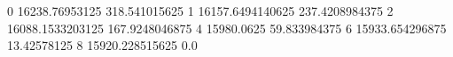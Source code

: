0 16238.76953125 318.541015625
1 16157.6494140625 237.4208984375
2 16088.1533203125 167.9248046875
4 15980.0625 59.833984375
6 15933.654296875 13.42578125
8 15920.228515625 0.0
